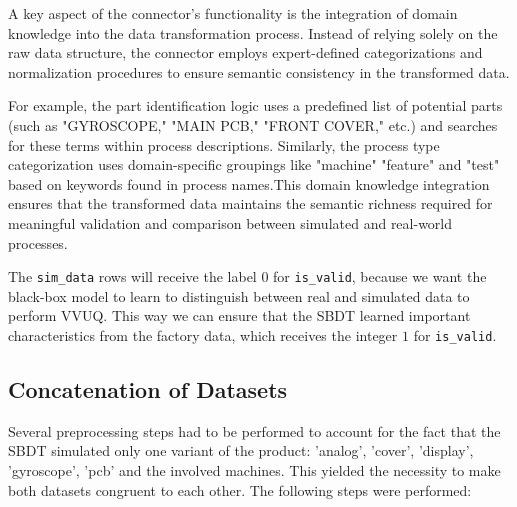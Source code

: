 A key aspect of the connector's functionality is the integration of domain knowledge into the data transformation process. Instead of relying solely on the raw data structure, the connector employs expert-defined categorizations and normalization procedures to ensure semantic consistency in the transformed data.

For example, the part identification logic uses a predefined list of potential parts (such as "GYROSCOPE," "MAIN PCB," "FRONT COVER," etc.) and searches for these terms within process descriptions. Similarly, the process type categorization uses domain-specific groupings like "machine" "feature" and "test" based on keywords found in process names.This domain knowledge integration ensures that the transformed data maintains the semantic richness required for meaningful validation and comparison between simulated and real-world processes.

The \texttt{sim\_data} rows will receive the label $0$ for \texttt{is\_valid}, because we want the black-box model to learn to distinguish between real and simulated data to perform VVUQ. This way we can ensure that the SBDT learned important characteristics from the factory data, which receives the integer $1$ for \texttt{is\_valid}.


\subsection{Concatenation of Datasets}

Several preprocessing steps had to be performed to account for the fact that the SBDT simulated only one variant of the product: 'analog', 'cover', 'display', 'gyroscope', 'pcb' and the involved machines. This yielded the necessity to make both datasets congruent to each other. The following steps were performed:

